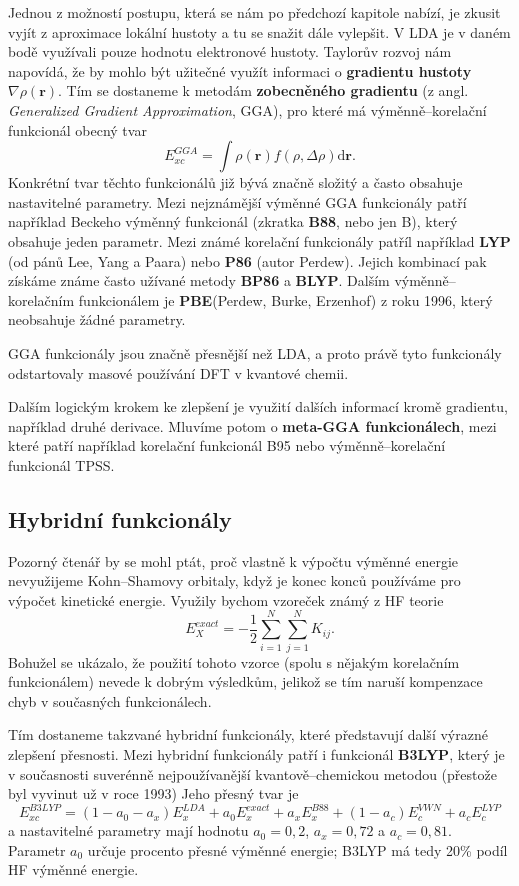 {Jednou z možností postupu, která se nám po předchozí kapitole nabízí, je zkusit vyjít z aproximace lokální hustoty a tu se snažit dále vylepšit. V LDA je v daném bodě využívali pouze hodnotu elektronové hustoty. Taylorův rozvoj nám napovídá, že by mohlo být užitečné využít informaci o \textbf{gradientu hustoty} $\nabla\rho(\textbf{r})$. 
Tím se dostaneme k metodám \textbf{zobecněného gradientu} (z angl. \textit{Generalized Gradient Approximation}, GGA), pro které má výměnně--korelační funkcionál obecný tvar
\begin{equation}
E_{xc}^{GGA}=\int \rho(\textbf{r})f(\rho,\Delta\rho) \mathrm{d}\textbf{r} .
\end{equation}
Konkrétní tvar těchto funkcionálů již bývá značně složitý a často obsahuje nastavitelné parametry. Mezi nejznámější výměnné GGA funkcionály patří například Beckeho výměnný funkcionál (zkratka \textbf{B88}, nebo jen B), který obsahuje jeden parametr. Mezi známé korelační funkcionály patříl například \textbf{LYP} (od pánů Lee, Yang a Paara) nebo \textbf{P86} (autor Perdew). Jejich kombinací pak získáme známe často užívané metody \textbf{BP86} a \textbf{BLYP}. Dalším výměnně--korelačním funkcionálem je \textbf{PBE}(Perdew, Burke, Erzenhof) z roku 1996, který neobsahuje žádné parametry.

GGA funkcionály jsou značně přesnější než LDA, a proto právě tyto funkcionály odstartovaly masové používání DFT v kvantové chemii.

Dalším logickým krokem ke zlepšení je využití dalších informací kromě gradientu, například druhé derivace. Mluvíme potom o \textbf{meta-GGA funkcionálech}, mezi které patří například korelační funkcionál B95 nebo výměnně--korelační funkcionál TPSS.

\subsection{Hybridní funkcionály}
Pozorný čtenář by se mohl ptát, proč vlastně k výpočtu výměnné energie nevyužijeme Kohn--Shamovy orbitaly, když je konec konců používáme pro výpočet kinetické energie. Využily bychom vzoreček známý z HF teorie 
\begin{equation}
E_X^{exact}=-\frac{1}{2}\sum_{i=1}^N\sum_{j=1}^N K_{ij} . 
\end{equation}
Bohužel se ukázalo, že použití tohoto vzorce (spolu s nějakým korelačním funkcionálem) nevede k dobrým výsledkům, jelikož se tím naruší kompenzace chyb v současných funkcionálech.

Tím dostaneme takzvané hybridní funkcionály, které představují další výrazné zlepšení přesnosti.
Mezi hybridní funkcionály patří i funkcionál \textbf{B3LYP}, který je v současnosti suverénně nejpoužívanější kvantově--chemickou metodou (přestože byl vyvinut už v roce 1993)
Jeho přesný tvar je
\begin{equation}
E_{xc}^{B3LYP}=(1-a_0-a_x)E_x^{LDA}+a_0E_x^{exact}+a_xE_x^{B88}+(1-a_c)E_c^{VWN}+a_c E_c^{LYP}
\end{equation}
a nastavitelné parametry mají hodnotu $a_0=0,2$, $a_x=0,72$ a $a_c=0,81$.
Parametr $a_0$ určuje procento přesné výměnné energie; B3LYP má tedy 20\% podíl HF výměnné energie.

}
